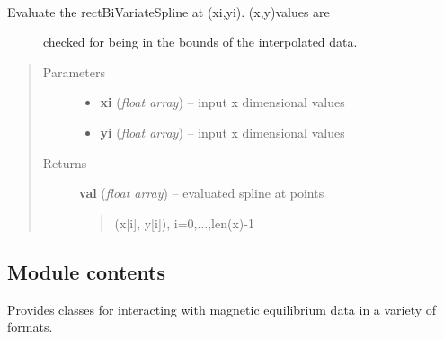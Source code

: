 \documentclass[letterpaper,10pt,english]{sphinxmanual}
\begin{document}
\begin{fulllineitems}
\begin{quote}
\begin{description}
\begin{itemize}
\end{itemize}

\end{description}\end{quote}

\begin{fulllineitems}
\label{eqtools:eqtools.trispline.RectBivariateSpline.ev}~\begin{description}
\item[{Evaluate the rectBiVariateSpline at (xi,yi).  (x,y)values are}] \leavevmode
checked for being in the bounds of the interpolated data.

\end{description}
\begin{quote}\begin{description}
\item[{Parameters}] \leavevmode\begin{itemize}
\item {} 
\textbf{xi} (\emph{float array}) --
input x dimensional values

\item {} 
\textbf{yi} (\emph{float array}) --
input x dimensional values

\end{itemize}

\item[{Returns}] \leavevmode

\textbf{val} (\emph{float array}) --
evaluated spline at points
\begin{quote}

(x{[}i{]}, y{[}i{]}), i=0,...,len(x)-1
\end{quote}


\end{description}\end{quote}

\end{fulllineitems}


\end{fulllineitems}



\subsection{Module contents}
\label{eqtools:module-eqtools}\label{eqtools:module-contents}
Provides classes for interacting with magnetic equilibrium data in a variety of formats.
\end{document}
